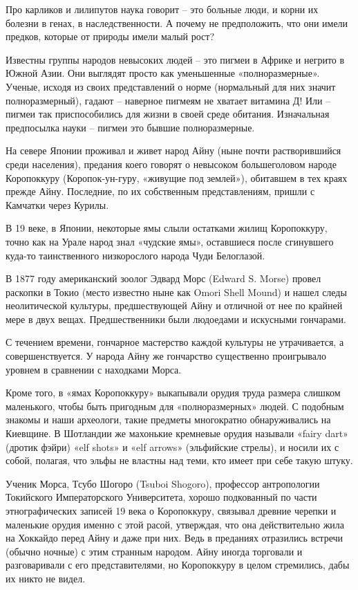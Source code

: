 Про карликов и лилипутов наука говорит – это больные люди, и корни их болезни в генах, в наследственности. А почему не предположить, что они имели предков, которые от природы имели малый рост?

Известны группы народов невысоких людей – это пигмеи в Африке и негрито в Южной Азии. Они выглядят просто как уменьшенные «полноразмерные». Ученые, исходя из своих представлений о норме (нормальный для них значит полноразмерный), гадают – наверное пигмеям не хватает витамина Д! Или – пигмеи так приспособились для жизни в своей среде обитания. Изначальная предпосылка науки – пигмеи это бывшие полноразмерные.

На севере Японии проживал и живет народ Айну (ныне почти растворившийся среди населения), предания коего говорят о невысоком большеголовом народе Коропоккуру (Коропок-ун-гуру, «живущие под землей»), обитавшем в тех краях прежде Айну. Последние, по их собственным представлениям, пришли с Камчатки через Курилы.

В 19 веке, в Японии, некоторые ямы слыли остатками жилищ Коропоккуру, точно как на Урале народ знал «чудские ямы», оставшиеся после сгинувшего куда-то таинственного низкорослого народа Чуди Белоглазой.

В 1877 году американский зоолог Эдвард Морс (Ed\-ward S. Morse) провел раскопки в Токио (место известно ныне как Omori Shell Mound) и нашел следы неолитической культуры, предшествующей Айну и отличной от нее по крайней мере в двух вещах. Предшественники были людоедами и искусными гончарами.

С течением времени, гончарное мастерство каждой культуры не утрачивается, а совершенствуется. У народа Айну же гончарство существенно проигрывало уровнем в сравнении с находками Морса.

Кроме того, в «ямах Коропоккуру» выкапывали орудия труда размера слишком маленького, чтобы быть пригодным для «полноразмерных» людей. С подобным знакомы и наши археологи, такие предметы многократно обнаруживались на Киевщине. В Шотландии же махонькие кремневые орудия называли «fairy dart» (дротик фэйри) «elf shots» и «elf arrows» (эльфийские стрелы), и носили их с собой, полагая, что эльфы не властны над теми, кто имеет при себе такую штуку.

Ученик Морса, Тсубо Шогоро (Tsuboi Shogoro), профессор антропологии Токийского Императорского Университета, хорошо подкованный по части этнографических записей 19 века о Коропоккуру, связывал древние черепки и маленькие орудия именно с этой расой, утверждая, что она действительно жила на Хоккайдо перед Айну и даже при них. Ведь в преданиях отразились встречи (обычно ночные) с этим странным народом. Айну иногда торговали и разговаривали с его представителями, но Коропоккуру в целом стремились, дабы их никто не видел.

